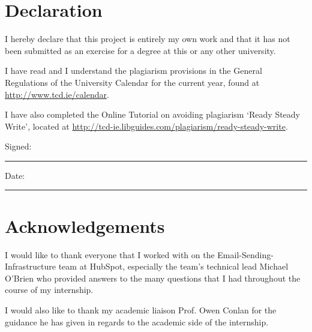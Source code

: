 \section*{\Huge{Declaration}}
\vspace{1cm}
I hereby declare that this project is entirely my own work and that it has not been submitted as an exercise for a degree at this or any other university.

\vspace{1cm}
I have read and I understand the plagiarism provisions in the General Regulations of the University Calendar for the current year, found at \url{http://www.tcd.ie/calendar}.
\vspace{1cm}

I have also completed the Online Tutorial on avoiding plagiarism `Ready Steady Write', located at
\url{http://tcd-ie.libguides.com/plagiarism/ready-steady-write}.
\vspace{3cm}

Signed:~\rule{5cm}{0.3pt}\hfill Date:~\rule{5cm}{0.3pt}

\newpage
\onehalfspacing
\raggedright %

\section*{\Huge{Acknowledgements}}
I would like to thank everyone that I worked with on the Email-Sending-Infrastructure team at HubSpot, especially the team's technical lead Michael O'Brien who provided answers to the many questions that I had throughout the course of my internship. 


I would also like to thank my academic liaison Prof. Owen Conlan for the guidance he has given in regards to the academic side of the internship.

\tableofcontents
\listoffigures
\listoftables
\lstlistoflistings
\newpage


